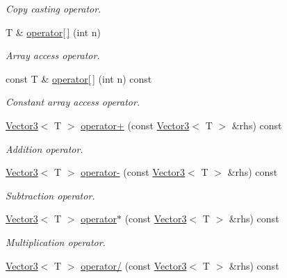\begin{DoxyCompactItemize}
\begin{DoxyCompactList}\small\item\em Copy casting operator. \item\end{DoxyCompactList}\item 
T \& \hyperlink{class_vector3_aa64b7a8c85eb2f80ee30155e26109a0a}{operator\mbox{[}$\,$\mbox{]}} (int n)
\begin{DoxyCompactList}\small\item\em Array access operator. \item\end{DoxyCompactList}\item 
const T \& \hyperlink{class_vector3_af0a225a033c235384b74377a62630365}{operator\mbox{[}$\,$\mbox{]}} (int n) const 
\begin{DoxyCompactList}\small\item\em Constant array access operator. \item\end{DoxyCompactList}\item 
\hyperlink{class_vector3}{Vector3}$<$ T $>$ \hyperlink{class_vector3_a97c1abe4d4242097f3dcc413277522f5}{operator+} (const \hyperlink{class_vector3}{Vector3}$<$ T $>$ \&rhs) const 
\begin{DoxyCompactList}\small\item\em Addition operator. \item\end{DoxyCompactList}\item 
\hyperlink{class_vector3}{Vector3}$<$ T $>$ \hyperlink{class_vector3_ad6a02e3ed199acf9b74e56639d546a28}{operator-\/} (const \hyperlink{class_vector3}{Vector3}$<$ T $>$ \&rhs) const 
\begin{DoxyCompactList}\small\item\em Subtraction operator. \item\end{DoxyCompactList}\item 
\hyperlink{class_vector3}{Vector3}$<$ T $>$ \hyperlink{class_vector3_a78351785ea5e7a84419a9975301d820c}{operator$\ast$} (const \hyperlink{class_vector3}{Vector3}$<$ T $>$ \&rhs) const 
\begin{DoxyCompactList}\small\item\em Multiplication operator. \item\end{DoxyCompactList}\item 
\hyperlink{class_vector3}{Vector3}$<$ T $>$ \hyperlink{class_vector3_afad9c64ba4b9cbf65ad5c662e4c5fddd}{operator/} (const \hyperlink{class_vector3}{Vector3}$<$ T $>$ \&rhs) const 

\end{DoxyCompactItemize}
